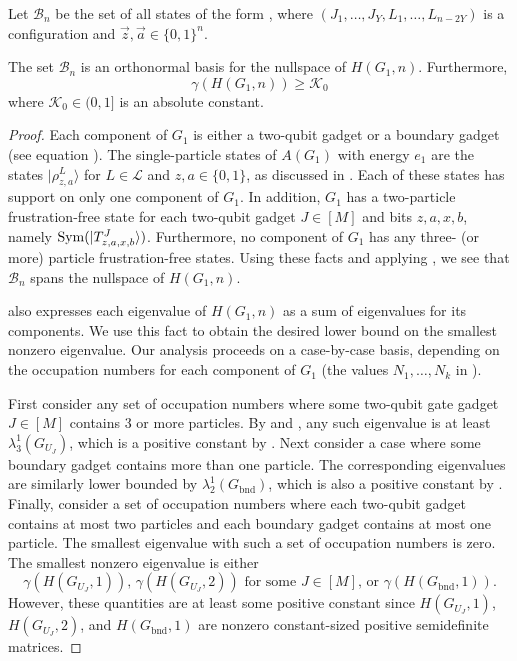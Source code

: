 \documentclass[../thesis-main/thesis-main]{subfiles}
\begin{document}
\begin{definition}
Let $\mathcal{B}_{n}$ be the set of all states of the form , where $(J_{1},\ldots,J_{Y},L_{1},\ldots,L_{n-2Y})$ is a configuration and $\vec{z},\vec{a}\in\{0,1\}^{n}$.
\end{definition}

\begin{lemma}
\label{lem:gs_g_alpha}The set $\mathcal{B}_{n}$ is an orthonormal
basis for the nullspace of $H(G_{1},n)$. Furthermore,
\begin{equation}
  \gamma(H(G_{1},n)) \geq \mathcal{K}_0
\label{eq:first_lowerbnd}
\end{equation}
where $\mathcal{K}_0\in (0,1]$ is an absolute constant.
\end{lemma}

\begin{proof}
Each component of $G_{1}$ is either a two-qubit gadget or a boundary gadget (see equation ). The single-particle states of $A(G_{1})$ with energy $e_{1}$ are the states $|\rho_{z,a}^{L}\rangle$ for $L\in\mathcal{L}$ and $z,a\in\{0,1\}$, as discussed in . Each of these states has support on only one component of $G_{1}$. In addition, $G_{1}$ has a two-particle frustration-free state for each two-qubit gadget $J\in[M]$ and bits $z,a,x,b$, namely $\operatorname{Sym}(|T_{z,a,x,b}^{J}\rangle)$. Furthermore, no component of $G_{1}$ has any three- (or more) particle frustration-free states. Using these facts and applying , we see that $\mathcal{B}_{n}$ spans the nullspace of $H(G_{1},n)$.

 also expresses each eigenvalue of $H(G_{1},n)$ as a sum of eigenvalues for its components. We use this fact to obtain the desired lower bound on the smallest nonzero eigenvalue. Our analysis proceeds on a case-by-case basis, depending on the occupation numbers for each component of $G_{1}$ (the values $N_{1},\ldots,N_{k}$ in ).

First consider any set of occupation numbers where some two-qubit gate gadget $J\in[M]$ contains 3 or more particles. By  and , any such eigenvalue is at least $\lambda_{3}^{1}(G_{U_J})$, which is a positive constant by . Next consider a case where some boundary gadget contains more than one particle. The corresponding eigenvalues are similarly lower bounded by $\lambda_{2}^{1}(G_{\text{bnd}})$, which is also a positive constant by . Finally, consider a set of occupation numbers where each two-qubit gadget contains at most two particles and each boundary gadget contains at most one particle. The smallest eigenvalue with such a set of occupation numbers is zero. The smallest nonzero eigenvalue is either
\[
\gamma(H(G_{U_J},1)),\,\gamma(H(G_{U_J},2))\text{ for some $J\in[M]$, or }\gamma(H(G_{\text{bnd}},1)).
\]
However, these quantities are at least some positive constant since $H(G_{U_J},1)$, $H(G_{U_J},2)$, and $H(G_{\text{bnd}},1)$ are nonzero constant-sized positive semidefinite matrices.


\end{proof}
\end{document}
